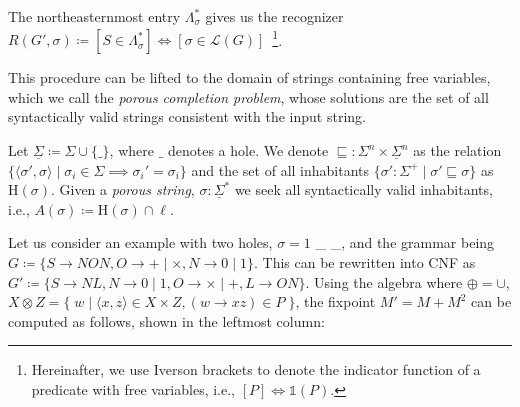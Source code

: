 \documentclass[sigplan,review,anonymous,acmsmall]{acmart}\settopmatter{printfolios=false,printccs=false,printacmref=false}
\begin{document}
  \noindent The northeasternmost entry $\Lambda^*_\sigma$ gives us the recognizer $R(G', \sigma) \coloneqq [S \in \Lambda^*_\sigma] \Leftrightarrow [\sigma \in \mathcal{L}(G)]$~\footnote{Hereinafter, we use Iverson brackets to denote the indicator function of a predicate with free variables, i.e., $[P] \Leftrightarrow \mathds{1}(P)$.}.

  This procedure can be lifted to the domain of strings containing free variables, which we call the \textit{porous completion problem}, whose solutions are the set of all syntactically valid strings consistent with the input string.

  \begin{definition}
    Let $\underline\Sigma \coloneqq \Sigma \cup \{\_\}$, where $\_$ denotes a hole. We denote $\sqsubseteq: \Sigma^n \times \underline\Sigma^n$ as the relation $\{\langle\sigma', \sigma\rangle \mid \sigma_i \in \Sigma \implies \sigma_i' = \sigma_i\}$ and the set of all inhabitants $\{\sigma': \Sigma^+ \mid \sigma' \sqsubseteq \sigma\}$ as $\text{H}(\sigma)$. Given a \textit{porous string}, $\sigma: \underline\Sigma^*$ we seek all syntactically valid inhabitants, i.e., $A(\sigma)\coloneqq\text{H}(\sigma)\cap\ell$.
  \end{definition}

  Let us consider an example with two holes, $\sigma = 1$ \_ \_, and the grammar being $G\coloneqq\{S\rightarrow N O N, O \rightarrow + \mid \times, N \rightarrow 0 \mid 1\}$. This can be rewritten into CNF as $G'\coloneqq \{S \rightarrow N L, N \rightarrow 0 \mid 1, O \rightarrow \times \mid +, L \rightarrow O N\}$. Using the algebra where $\oplus=\cup$, $X \otimes Z = \big\{\;w \mid \langle x, z\rangle \in X \times Z, (w\rightarrow xz) \in P\;\big\}$, the fixpoint $M' = M + M^2$ can be computed as follows, shown in the leftmost column:\\
\end{document}
